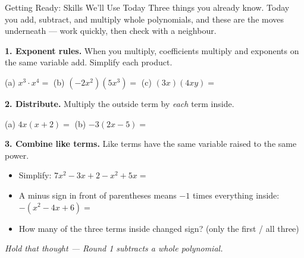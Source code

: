 \documentclass[12pt]{article}
\begin{document}

\vspace{0.10in}

\begin{notesbox}{Getting Ready: Skills We'll Use Today}
Three things you already know. Today you add, subtract, and multiply whole polynomials, and
these are the moves underneath --- work quickly, then check with a neighbour.

\vspace{8pt}
\textbf{1. Exponent rules.} When you multiply, coefficients multiply and exponents on the same
variable add. Simplify each product.
\begin{center}
(a)\; $x^3\cdot x^4=$  \qquad
(b)\; $(-2x^2)(5x^3)=$  \qquad
(c)\; $(3x)(4xy)=$ 
\end{center}

\vspace{8pt}
\textbf{2. Distribute.} Multiply the outside term by \emph{each} term inside.
\begin{center}
(a)\; $4x(x+2)=$  \qquad\qquad
(b)\; $-3(2x-5)=$ 
\end{center}

\vspace{8pt}
\textbf{3. Combine like terms.} Like terms have the same variable raised to the same power.
\begin{itemize}[leftmargin=1.6em, itemsep=8pt]
  \item Simplify: \; $7x^2-3x+2-x^2+5x=$ 
  \item A minus sign in front of parentheses means $-1$ times everything inside: \\[2pt]
        $-(x^2-4x+6)=$ 
  \item How many of the three terms inside changed sign? 
        (only the first / all three)
\end{itemize}
\textit{Hold that thought --- Round 1 subtracts a whole polynomial.}
\end{notesbox}
\end{document}
